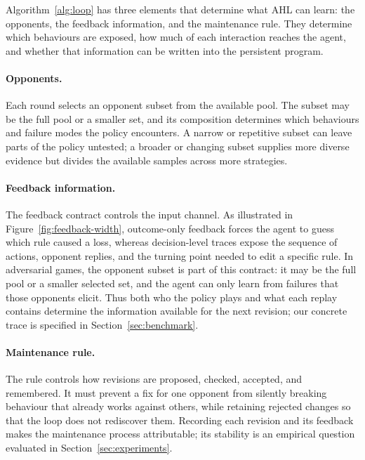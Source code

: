 Algorithm~\ref{alg:loop} has three elements that determine what AHL can learn:
the opponents, the feedback information, and the maintenance rule. They determine
which behaviours are exposed, how much of each interaction reaches the agent, and
whether that information can be written into the persistent program.

\paragraph{Opponents.}
Each round selects an opponent subset from the available pool. The subset may be
the full pool or a smaller set, and its composition determines which behaviours and
failure modes the policy encounters. A narrow or repetitive subset can leave parts
of the policy untested; a broader or changing subset supplies more diverse evidence
but divides the available samples across more strategies.

\paragraph{Feedback information.}
The feedback contract controls the input channel. As illustrated in
Figure~\ref{fig:feedback-width}, outcome-only feedback forces the
agent to guess which rule caused a loss, whereas decision-level traces expose the
sequence of actions, opponent replies, and the turning point needed to edit a
specific rule. In adversarial games, the opponent subset is part of this contract:
it may be the full pool or a smaller selected set, and the agent can only learn from
failures that those opponents elicit. Thus both who the policy plays and what each replay contains determine the information
available for the next revision; our concrete trace is specified in
Section~\ref{sec:benchmark}.

\paragraph{Maintenance rule.}
The rule controls how revisions are proposed, checked, accepted, and remembered.
It must prevent a fix for one opponent from silently breaking behaviour that already
works against others, while retaining rejected changes so that the loop does not
rediscover them. Recording each revision and its feedback makes the maintenance
process attributable; its stability is an empirical question evaluated in
Section~\ref{sec:experiments}.
